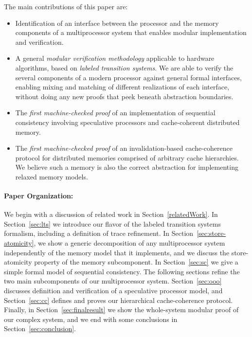 The main contributions of this paper are:
\vspace{-.3cm}
\begin{itemize} 
\item Identification of an interface between the processor and the memory
components of a multiprocessor system that enables modular implementation and
verification.

\item A general \emph{modular verification methodology} applicable to hardware
algorithms, based on \emph{labeled transition systems}.  We are able to verify
the several components of a modern processor against general formal interfaces,
enabling mixing and matching of different realizations of each interface,
without doing any new proofs that peek beneath abstraction boundaries.

\item The \emph{first machine-checked proof} of an implementation of sequential
consistency involving speculative processors and cache-coherent distributed
memory.

\item The \emph{first machine-checked proof} of an invalidation-based
cache-coherence protocol for distributed memories comprised of arbitrary cache
hierarchies. We believe such a memory is also the correct abstraction for
implementing relaxed memory models.
\end{itemize}

\paragraph{Paper Organization:} We begin with a discussion of related work in
Section~\ref{relatedWork}. In Section~\ref{sec:lts} we introduce our flavor of
the labeled transition systems formalism, including a definition of trace
refinement. In Section~\ref{sec:store-atomicity}, we show a generic
decomposition of any multiprocessor system independently of the memory model
that it implements, and we discuss the store-atomicity property of the memory
subcomponent. In Section~\ref{sec:sc} we give a simple formal model of
sequential consistency.  The following sections refine the two main
subcomponents of our multiprocessor system.  Section~\ref{sec:ooo} discusses
definition and verification of a speculative processor model, and
Section~\ref{sec:cc} defines and proves our hierarchical cache-coherence
protocol.  Finally, in Section~\ref{sec:finalresult} we show the whole-system
modular proof of our complex system, and we end with some conclusions in
Section~\ref{sec:conclusion}.

